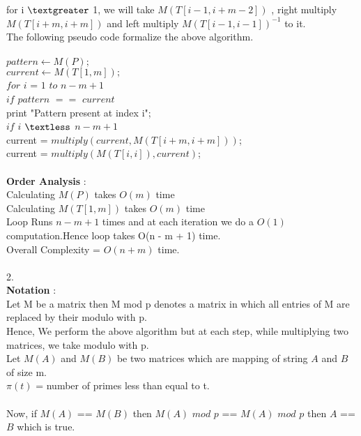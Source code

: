 \documentclass{article}
\begin{document}
for i $\textgreater$ 1, we will take $M(T[i-1,i+m-2])$ , right multiply $M(T[i+m,i+m])$ and left multiply $M(T[i-1,i-1])^{-1}$ to it. \\ 
The following pseudo code formalize the above algorithm. \\\\
$ pattern \leftarrow M(P) ;$ \\
$ current \leftarrow M(T[1,m]) ; $ \\
$for $ $ i $ = $ 1 $ $to$ $ n - m + 1 $ \\
\hspace*{1cm}  $if$ $pattern$ $==$ $current $ \\ 
\hspace*{2cm} print "Pattern present at index i"; \\ 
\hspace*{1cm} $ if$ $i$ $\textless$ $n - m + 1 $ \\ 
\hspace*{2cm}  	current = $multiply(current,M(T[i+m,i+m]))$; \\ 
\hspace*{2cm}  	current = $multiply(M(T[i,i]),current)$; \\\\
\textbf{Order Analysis} :\\
Calculating $M(P)$ takes $O(m)$ time  \\
Calculating $M(T[1,m])$ takes $O(m)$ time \\
Loop Runs $n - m + 1$ times and at each iteration we do a $O(1)$ computation.Hence loop takes O(n - m + 1) time. \\ 
Overall Complexity = $O(n + m)$ time. \\\\
2. \\
\textbf{Notation} :  \\
Let M be a matrix then M mod p denotes a matrix in which all entries of M are replaced by their modulo with p.\\
Hence, We perform the above algorithm but at each step, while multiplying two matrices, we take modulo with p. \\
Let $M(A)$ and $M(B)$ be two matrices which are mapping of string $A$ and $B$ of size m. \\
$\pi(t)$ = number of primes less than equal to t. \\\\
Now, if $M(A)$ == $M(B)$ then $M(A)$ $mod$ $p$ == $M(A)$ $mod$ $p$ then $A$ == $B$ which is true. \\
\end{document}
